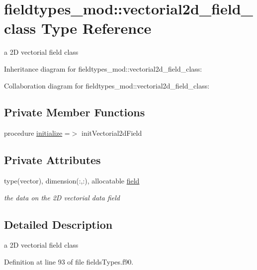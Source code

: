 \hypertarget{structfieldtypes__mod_1_1vectorial2d__field__class}{}\section{fieldtypes\+\_\+mod\+:\+:vectorial2d\+\_\+field\+\_\+class Type Reference}
\label{structfieldtypes__mod_1_1vectorial2d__field__class}


a 2D vectorial field class  




Inheritance diagram for fieldtypes\+\_\+mod\+:\+:vectorial2d\+\_\+field\+\_\+class\+:


Collaboration diagram for fieldtypes\+\_\+mod\+:\+:vectorial2d\+\_\+field\+\_\+class\+:
\subsection*{Private Member Functions}
\begin{DoxyCompactItemize}
\item 
procedure \mbox{\hyperlink{structfieldtypes__mod_1_1vectorial2d__field__class_a78b96468a2b6db94a88fbe8b2d8ec044}{initialize}} =$>$ init\+Vectorial2d\+Field
\end{DoxyCompactItemize}
\subsection*{Private Attributes}
\begin{DoxyCompactItemize}
\item 
type(vector), dimension(\+:,\+:), allocatable \mbox{\hyperlink{structfieldtypes__mod_1_1vectorial2d__field__class_ac10c2c4dfbc504948d46922d7e133976}{field}}
\begin{DoxyCompactList}\small\item\em the data on the 2D vectorial data field \end{DoxyCompactList}\end{DoxyCompactItemize}


\subsection{Detailed Description}
a 2D vectorial field class 

Definition at line 93 of file fields\+Types.\+f90.



